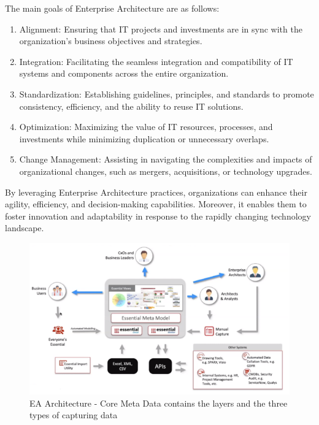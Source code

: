 \documentclass{article}
\begin{document}
The main goals of Enterprise Architecture are as follows:
\begin{enumerate}
    \item Alignment: Ensuring that IT projects and investments are in sync with the organization's business objectives and strategies.
    \item Integration: Facilitating the seamless integration and compatibility of IT systems and components across the entire organization.
    \item Standardization: Establishing guidelines, principles, and standards to promote consistency, efficiency, and the ability to reuse IT solutions.
    \item Optimization: Maximizing the value of IT resources, processes, and investments while minimizing duplication or unnecessary overlaps.
    \item Change Management: Assisting in navigating the complexities and impacts of organizational changes, such as mergers, acquisitions, or technology upgrades.
\end{enumerate}

By leveraging Enterprise Architecture practices, organizations can enhance their agility, efficiency, and decision-making capabilities. Moreover, it enables them to foster innovation and adaptability in response to the rapidly changing technology landscape.

\begin{figure}[ht!]
    \centering
    \includegraphics[scale=0.8]{ea-architecture}
    \caption{EA Architecture - 
Core Meta Data contains the layers and the three types of capturing data }
    \label{fig:ea-architecture}
\end{figure}
\end{document}
